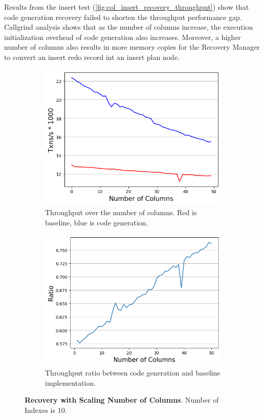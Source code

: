 \documentclass[12pt]{cmuthesis}
\begin{document}
Results from the insert test (\cref{fig:col_insert_recovery_throughput}) show that code generation recovery failed to shorten the throughput performance gap. Callgrind analysis shows that as the number of columns increase, the execution initialization overhead of code generation also increases. Moreover, a higher number of columns also results in more memory copies for the Recovery Manager to convert an insert redo record int an insert plan node.

\begin{figure}[ht!]
\centering
\begin{subfigure}{.44\textwidth}
 \centering
 \includegraphics[width=1.0\textwidth]{images/ColumnRecoveryIndex.png}
 \caption{Throughput over the number of columns. Red is baseline, blue is code generation.}
  \label{fig:col_recovery_throughput_index}
\end{subfigure}%
\begin{subfigure}{.45\textwidth}
 \centering
 \includegraphics[width=1.0\textwidth]{images/ColumnRecoveryIndexRatio.png}
 \caption{Throughput ratio between code generation and baseline implementation.}
  \label{fig:col_recovery_ratio_index}
\end{subfigure}
\caption{\textbf{Recovery with Scaling Number of Columns}. Number of Indexes is 10. }
\label{fig:col_recovery_throughput_index}
\end{figure}
\end{document}
